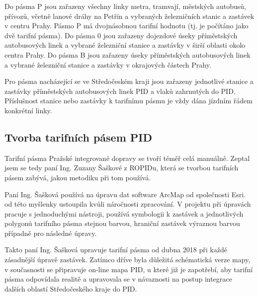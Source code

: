 Do pásma P jsou zařazeny všechny linky metra, tramvají, městských autobusů, přívozů,
včetně lanové dráhy na Petřín a vybraných železničních stanic a zastávek v centru Prahy.
Pásmo P má dvojnásobnou tarifní hodnotu (tj. je počítáno jako dvě tarifní pásma).
Do pásma 0 jsou zařazeny dojezdové úseky příměstských autobusových linek a vybrané
železniční stanice a zastávky v širší oblasti okolo centra Prahy.
Do pásma B jsou zařazeny úseky příměstských autobusových linek a vybrané 
železniční stanice a zastávky v okrajových částech Prahy. \cite{pid} 

Pro pásma nacházející se ve Středočeském kraji jsou zařazeny jednotlivé stanice 
a zastávky příměstských autobusových linek PID a vlaků zahrnutých do PID. 
Příslušnost stanice nebo zastávky k tarifnímu pásmu je vždy dána jízdním řádem konkrétní linky.\cite{pid}

\subsection{Tvorba tarifních pásem PID}

Tarifní pásma Pražské integrované dopravy se tvoří téměř celá manuálně. Zeptal jsem
se tedy paní Ing. Zuzany Šaškové z ROPIDu, která se tvorbou tarifních pásem zabývá, jakou metodiku
při tom používá. 

Paní Ing. Šašková používá na úpravu dat software ArcMap od společnosti Esri.
\textit{} od této
myšlenky ustoupila kvůli náročnosti zpracování. \textit{}
V projektu při úpravách pracuje s jednoduchými nástroji, používá symbologii k 
zastávek a jednotlivých polygonů tarifního pásma stejnou barvou, hraniční zastávek výraznou barvou 
případně pro následné úpravy. \textit{}

Takto paní Ing. Šašková upravuje tarifní pásma od dubna 2018 při každé zásadnější úpravě zastávek. 
Zatímco dříve byla důležitá schématická verze mapy, v současnosti se připravuje on-line mapa PID, u které již je zapotřebí, 
aby tarifní pásma odpovídala realitě a upravovala se v návaznosti na postup
integrace dalších oblastí Středočeského kraje do PID.

